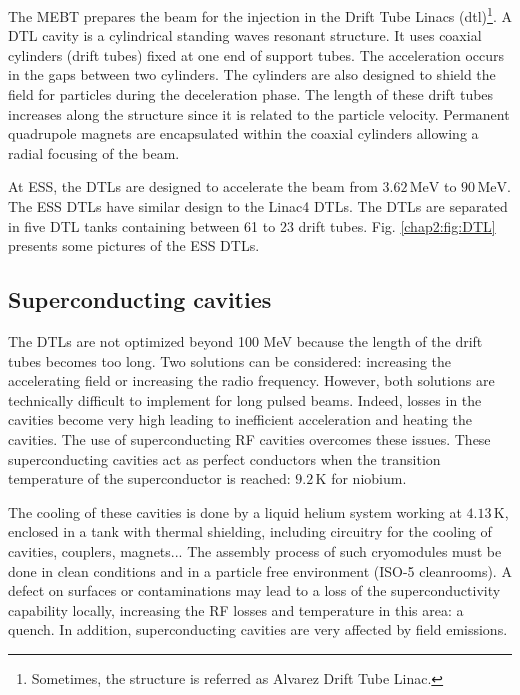 \begin{refsection}
  

  
  The MEBT prepares the beam for the injection in the Drift Tube Linacs (\acrshort{dtl})\footnote{Sometimes, the structure is referred as Alvarez Drift Tube Linac.}.
  A DTL cavity is a cylindrical standing waves resonant structure. It uses coaxial cylinders (drift tubes) fixed at one end of support tubes. The acceleration occurs in the gaps between two cylinders. The cylinders are also designed to shield the field for particles during the deceleration phase. The length of these drift tubes increases along the structure since it is related to the particle velocity. Permanent quadrupole magnets are encapsulated within the coaxial cylinders allowing a radial focusing of the beam.

  At ESS, the DTLs are designed to accelerate the beam from $3.62\,\mathrm{MeV}$ to $90\,\mathrm{MeV}$. The ESS DTLs have similar design to the Linac4 DTLs. The DTLs are separated in five DTL tanks containing between 61 to 23 drift tubes. Fig. \ref{chap2:fig:DTL} presents some pictures of the ESS DTLs.


  \subsection{Superconducting cavities}
  The DTLs are not optimized beyond 100 MeV because the length of the drift tubes becomes too long. Two solutions can be considered: increasing the accelerating field or increasing the radio frequency. However, both solutions are technically difficult to implement for long pulsed beams. Indeed, losses in the cavities become very high leading to inefficient acceleration and heating the cavities. The use of superconducting RF cavities overcomes these issues. These superconducting cavities act as perfect conductors when the transition temperature of the superconductor is reached: $9.2\,\mathrm{K}$ for niobium.

  The cooling of these cavities is done by a liquid helium system working at $4.13\,\mathrm{K}$, enclosed in a tank with thermal shielding, including circuitry for the cooling of cavities, couplers, magnets... The assembly process of such cryomodules must be done in clean conditions and in a particle free environment (ISO-5 cleanrooms). A defect on surfaces or contaminations may lead to a loss of the superconductivity capability locally, increasing the RF losses and temperature in this area: a quench.
  In addition, superconducting cavities are very affected by field emissions.


\end{refsection}
